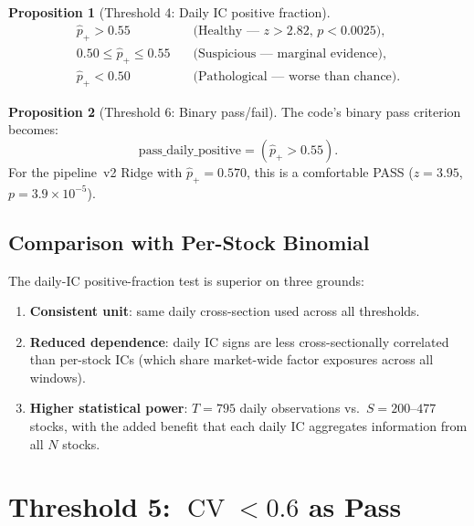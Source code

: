\documentclass[11pt,a4paper]{article}
\theoremstyle{definition}
\newtheorem{proposition}{Proposition}[section]
\newcommand{\CV}{\operatorname{CV}}
\begin{document}
\begin{proposition}[Threshold 4: Daily IC positive fraction]
\label{prop:thresh4}
\begin{align}
    \boxed{\hat{p}_{+} > 0.55} &\quad\text{(Healthy --- $z > 2.82$, $p < 0.0025$)}, \\
    \boxed{0.50 \leq \hat{p}_{+} \leq 0.55} &\quad\text{(Suspicious --- marginal evidence)}, \\
    \boxed{\hat{p}_{+} < 0.50} &\quad\text{(Pathological --- worse than chance)}.
\end{align}
\end{proposition}

\begin{proposition}[Threshold 6: Binary pass/fail]
\label{prop:thresh6}
The code's binary pass criterion becomes:
\begin{equation}
    \boxed{\text{pass\_daily\_positive} = (\hat{p}_{+} > 0.55)}.
\end{equation}
For the pipeline~v2 Ridge with $\hat{p}_{+}=0.570$, this is a
comfortable PASS ($z=3.95$, $p = 3.9\times10^{-5}$).
\end{proposition}

\subsection{Comparison with Per-Stock Binomial}

The daily-IC positive-fraction test is superior on three grounds:
\begin{enumerate}[nosep]
    \item \textbf{Consistent unit}: same daily cross-section used across
          all thresholds.
    \item \textbf{Reduced dependence}: daily IC signs are less
          cross-sectionally correlated than per-stock ICs (which share
          market-wide factor exposures across all windows).
    \item \textbf{Higher statistical power}: $T=795$ daily observations
          vs.\ $S=200$--$477$ stocks, with the added benefit that each
          daily IC aggregates information from all $N$ stocks.
\end{enumerate}

\section{Threshold 5: \texorpdfstring{$\CV < 0.6$}{CV < 0.6} as Pass}
\label{sec:thresh5}
\end{document}
